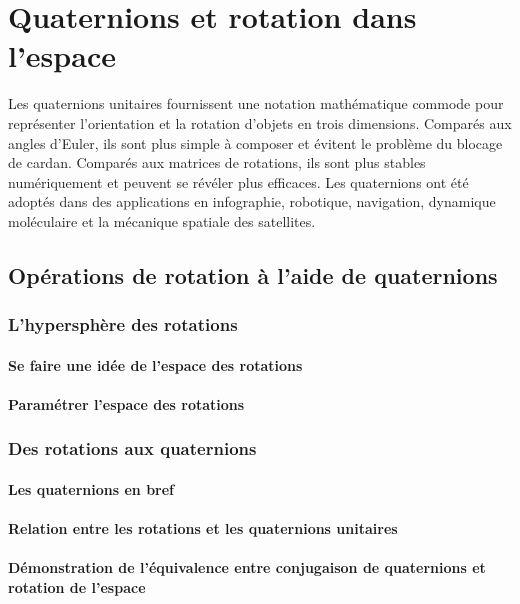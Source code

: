 
\chapter{Quaternions et rotation dans l'espace}

Les quaternions unitaires fournissent une notation mathématique commode pour représenter l'orientation et la rotation d'objets en trois dimensions. Comparés aux angles d'Euler, ils sont plus simple à composer et évitent le problème du blocage de cardan. Comparés aux matrices de rotations, ils sont plus stables numériquement et peuvent se révéler plus efficaces. Les quaternions ont été adoptés dans des applications en infographie, robotique, navigation, dynamique moléculaire et la mécanique spatiale des satellites.

\section{Opérations de rotation à l'aide de quaternions}
	\subsection{L'hypersphère des rotations}
		\subsubsection{Se faire une idée de l'espace des rotations}
		\subsubsection{Paramétrer l'espace des rotations}
	\subsection{Des rotations aux quaternions}
		\subsubsection{Les quaternions en bref}
		\subsubsection{Relation entre les rotations et les quaternions unitaires}
		\subsubsection{Démonstration de l'équivalence entre conjugaison de quaternions et rotation de l'espace}
